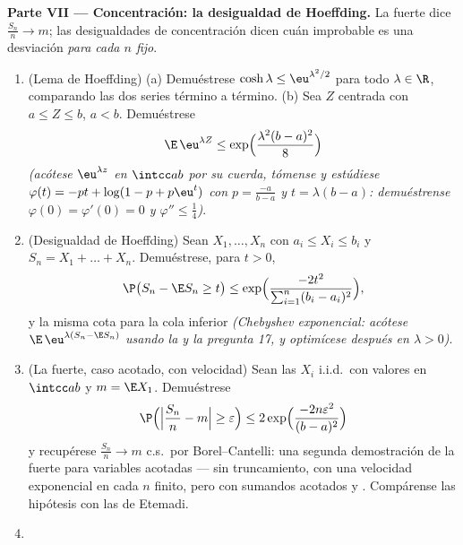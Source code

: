 \begin{problem}
\medskip
\noindent\textbf{Parte VII --- Concentración: la desigualdad de
Hoeffding.} La  fuerte dice
$\frac{S_n}n \to m$; las desigualdades de concentración dicen cuán
improbable es una desviación \emph{para cada $n$ fijo}.
\begin{enumerate}[resume]
  \item (Lema de Hoeffding) (a) Demuéstrese
  $\cosh\lambda \leq \eu^{\lambda^2/2}$ para todo $\lambda \in \R$,
  comparando las dos series término a término. (b) Sea $Z$ centrada con
  $a \leq Z \leq b$, $a < b$. Demuéstrese
        \[
        \E\,\eu^{\lambda Z} \leq
        \exp\Bigl(\frac{\lambda^2(b - a)^2}8\Bigr)
        \]
        \emph{(acótese $\eu^{\lambda z}$ en $\intcc ab$ por su cuerda,
        tómense  y
        estúdiese $\varphi(t)
        = -pt + \log(1 - p + p\eu^t)$ con $p =
        \frac{-a}{b-a}$ y $t = \lambda(b - a)$: demuéstrense
        $\varphi(0) = \varphi'(0) = 0$ y $\varphi''
        \leq \frac14$)}. \item (Desigualdad de Hoeffding) Sean
        $X_1, \dots, X_n$
         con
        $a_i \leq X_i \leq b_i$ y $S_n =
        X_1 + \dots + X_n$. Demuéstrese, para $t > 0$,
        \[
        \P\bigl(S_n - \E S_n \geq t\bigr) \leq
        \exp\Bigl(\frac{-2t^2}{\sum_{i=1}^n(b_i -
        a_i)^2}\Bigr),
        \]
        y la misma cota para la cola inferior \emph{(Chebyshev
        exponencial: acótese $\E\,\eu^{\lambda(S_n - \E S_n)}$ usando la
         y la
        pregunta 17, y optimícese después en
        $\lambda > 0$)}.
  \item (La  fuerte, caso acotado,
  con velocidad) Sean las $X_i$ i.i.d.\ con valores en $\intcc ab$ y $m
        = \E X_1$. Demuéstrese
        \[
        \P\Bigl(\Bigl|\frac{S_n}n - m\Bigr| \geq
        \varepsilon\Bigr) \leq
        2\exp\Bigl(\frac{-2n\varepsilon^2}{(b - a)^2}\Bigr)
        \]
        y recupérese $\frac{S_n}n \to m$ c.s.\ por Borel--Cantelli: una
        segunda demostración de la
         fuerte para variables
        acotadas --- sin truncamiento, con una velocidad exponencial en
        cada $n$ finito, pero con sumandos acotados y
        . Compárense las hipótesis con las de Etemadi. \item

\end{enumerate}
\end{problem}
